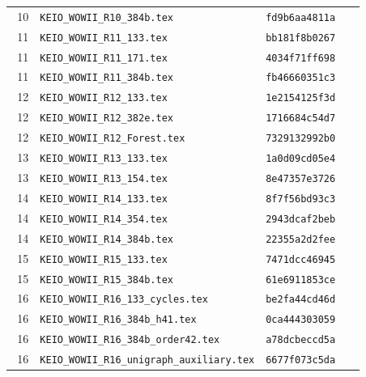 \documentclass[11pt,a4paper]{article}
\theoremstyle{definition}\newtheorem{definition}[theorem]{Definition}
\theoremstyle{remark}\newtheorem{remark}[theorem]{Remark}
\begin{document}
\begin{longtable}{rp{0.64\linewidth}l}
10&\nolinkurl{KEIO_WOWII_R10_384b.tex}&\texttt{fd9b6aa4811a}\\

11&\nolinkurl{KEIO_WOWII_R11_133.tex}&\texttt{bb181f8b0267}\\

11&\nolinkurl{KEIO_WOWII_R11_171.tex}&\texttt{4034f71ff698}\\

11&\nolinkurl{KEIO_WOWII_R11_384b.tex}&\texttt{fb46660351c3}\\

12&\nolinkurl{KEIO_WOWII_R12_133.tex}&\texttt{1e2154125f3d}\\

12&\nolinkurl{KEIO_WOWII_R12_382e.tex}&\texttt{1716684c54d7}\\

12&\nolinkurl{KEIO_WOWII_R12_Forest.tex}&\texttt{7329132992b0}\\

13&\nolinkurl{KEIO_WOWII_R13_133.tex}&\texttt{1a0d09cd05e4}\\

13&\nolinkurl{KEIO_WOWII_R13_154.tex}&\texttt{8e47357e3726}\\

14&\nolinkurl{KEIO_WOWII_R14_133.tex}&\texttt{8f7f56bd93c3}\\

14&\nolinkurl{KEIO_WOWII_R14_354.tex}&\texttt{2943dcaf2beb}\\

14&\nolinkurl{KEIO_WOWII_R14_384b.tex}&\texttt{22355a2d2fee}\\

15&\nolinkurl{KEIO_WOWII_R15_133.tex}&\texttt{7471dcc46945}\\

15&\nolinkurl{KEIO_WOWII_R15_384b.tex}&\texttt{61e6911853ce}\\

16&\nolinkurl{KEIO_WOWII_R16_133_cycles.tex}&\texttt{be2fa44cd46d}\\

16&\nolinkurl{KEIO_WOWII_R16_384b_h41.tex}&\texttt{0ca444303059}\\

16&\nolinkurl{KEIO_WOWII_R16_384b_order42.tex}&\texttt{a78dcbeccd5a}\\

16&\nolinkurl{KEIO_WOWII_R16_unigraph_auxiliary.tex}&\texttt{6677f073c5da}\\


\end{longtable}
\end{document}
